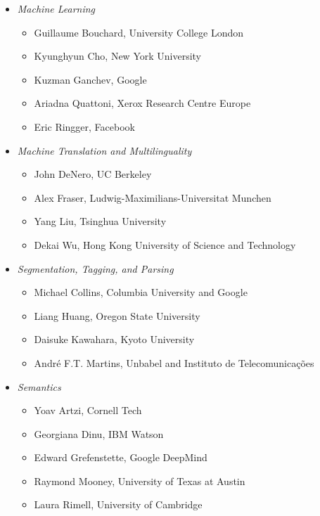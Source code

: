 \begin{itemize}[itemsep=7pt, leftmargin=0cm, label={}]
\begin{itemize}[leftmargin=0.5cm, itemsep=6pt, label={}]
\item \emph{Machine Learning}

\begin{itemize}[nosep, leftmargin=0.5cm, label={}]
\item Guillaume Bouchard, University College London 
 \item   Kyunghyun Cho, New York University 
\item    Kuzman Ganchev, Google 
\item    Ariadna Quattoni, Xerox Research Centre Europe 
\item    Eric Ringger, Facebook 
\end{itemize}

\item \emph{Machine Translation and Multilinguality}

\begin{itemize}[nosep, leftmargin=0.5cm, label={}]
\item John DeNero, UC Berkeley 
\item    Alex Fraser, Ludwig-Maximilians-Universitat Munchen 
\item    Yang Liu, Tsinghua University 
\item    Dekai Wu, Hong Kong University of Science and Technology 
\end{itemize}

\item \emph{Segmentation, Tagging, and Parsing}

\begin{itemize}[nosep, leftmargin=0.5cm, label={}]
\item Michael Collins, Columbia University and Google  
\item    Liang Huang, Oregon State University  
\item    Daisuke Kawahara, Kyoto University  
\item    Andr{\'e} F.T. Martins, Unbabel and Instituto de Telecomunicações 
\end{itemize}

\item \emph{Semantics}

\begin{itemize}[nosep, leftmargin=0.5cm, label={}]
\item Yoav Artzi, Cornell Tech 
\item    Georgiana Dinu, IBM Watson 
\item    Edward  Grefenstette, Google DeepMind 
\item    Raymond Mooney, University of Texas at Austin 
\item    Laura Rimell, University of Cambridge 
\end{itemize}


\end{itemize}
\end{itemize}
